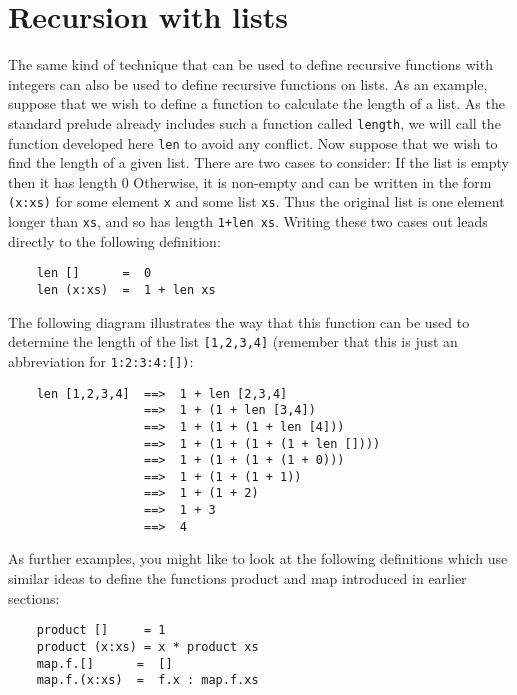 \section{Recursion with lists}
The same kind of  technique  that  can  be  used  to  define  recursive
functions with integers can also be used to define recursive  functions
on lists.  As an example, suppose that we wish to define a function  to
calculate the length of  a  list.   As  the  standard  prelude  already
includes such a function called \verb"length", we  will  call  the  function
developed here \verb"len" to avoid any conflict.  Now suppose that  we  wish
to find the length of a given list.  There are two cases to consider:
\BSI
\IT  If the list is empty then it has length 0
\IT  Otherwise, it is non-empty and can be written in the  form  \verb"(x:xs)"
     for some element \verb"x" and some list \verb"xs".
     Thus the  original  list  is
     one element longer than \verb"xs", and so has length \verb"1+len xs".
\ESI
Writing these two cases out leads directly to the following definition:
\begin{verbatim}
    len []      =  0
    len (x:xs)  =  1 + len xs
\end{verbatim}
The following diagram illustrates the way that  this  function  can  be
used to determine the length of the list \verb"[1,2,3,4]" (remember that  this
is just an abbreviation for \verb"1:2:3:4:[])":
\begin{verbatim}
    len [1,2,3,4]  ==>  1 + len [2,3,4]
                   ==>  1 + (1 + len [3,4])
                   ==>  1 + (1 + (1 + len [4]))
                   ==>  1 + (1 + (1 + (1 + len [])))
                   ==>  1 + (1 + (1 + (1 + 0)))
                   ==>  1 + (1 + (1 + 1))
                   ==>  1 + (1 + 2)
                   ==>  1 + 3
                   ==>  4
\end{verbatim}
As  further  examples,  you  might  like  to  look  at  the   following
definitions which use similar ideas to define the functions product and
map introduced in earlier sections:
\begin{verbatim}
    product []     = 1
    product (x:xs) = x * product xs
    map.f.[]      =  []
    map.f.(x:xs)  =  f.x : map.f.xs
\end{verbatim}

